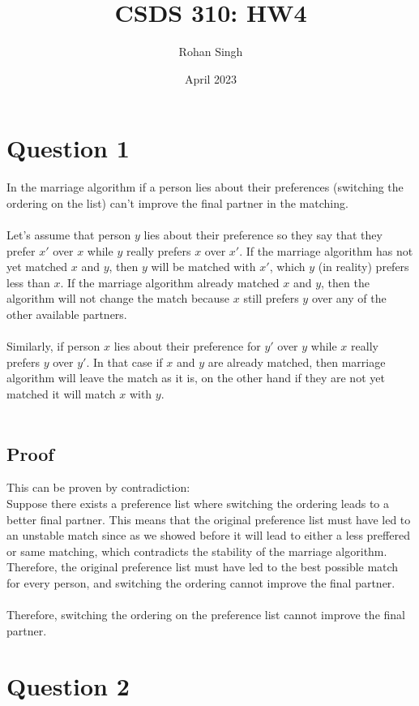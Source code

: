 \documentclass{article}
\title{CSDS 310: HW4}
\author{Rohan Singh}
\date{April 2023}
\begin{document}
\maketitle

\section{Question 1}
In the marriage algorithm if a person lies about their preferences (switching the ordering on the list) can't improve the final partner in the matching.\\\\
Let's assume that person $y$ lies about their preference so they say that they prefer $x'$ over $x$ while $y$ really prefers $x$ over $x'$. If the marriage algorithm has not yet matched $x$ and $y$, then $y$ will be matched with $x'$, which $y$ (in reality) prefers less than $x$. If the marriage algorithm already matched $x$ and $y$, then the algorithm will not change the match because $x$ still prefers $y$ over any of the other available partners.\\\\
Similarly, if person $x$ lies about their preference for $y'$ over $y$ while $x$ really prefers $y$ over $y'$. In that case if $x$ and $y$ are already matched, then marriage algorithm will leave the match as it is, on the other hand if they are not yet matched it will match $x$ with $y$.\\\\

\subsection{Proof}
This can be proven by contradiction:\\
Suppose there exists a preference list where switching the ordering leads to a better final partner. This means that the original preference list must have led to an unstable match since as we showed before it will lead to either a less preffered or same matching, which contradicts the stability of the marriage algorithm. Therefore, the original preference list must have led to the best possible match for every person, and switching the ordering cannot improve the final partner.\\\\
Therefore, switching the ordering on the preference list cannot improve the final partner. 

\section{Question 2}
\end{document}

